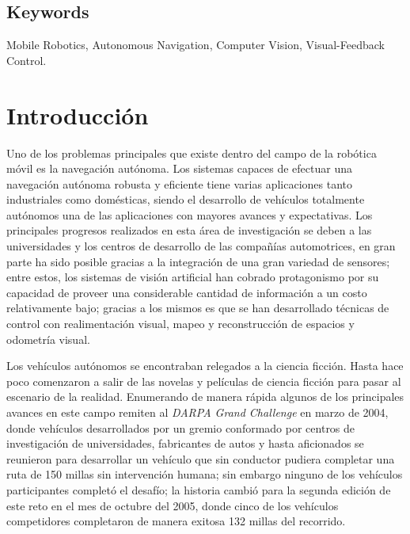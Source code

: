 \documentclass[12pt, letterpaper, oneside]{book}
\begin{document}
	\section*{Keywords}
	\label{sec:kw}
	Mobile Robotics, Autonomous Navigation, Computer Vision, Visual-Feedback Control.
	\renewcommand{\listfigurename}{Lista de Figuras}
	\renewcommand{\listtablename}{Lista de Tablas}
	\renewcommand{\contentsname}{Índice General}
	\renewcommand*{\lstlistlistingname}{Lista de Códigos}
	\tableofcontents
	\cleardoublepage
	\listoffigures
	\cleardoublepage
	\listoftables
	\cleardoublepage
	\lstlistoflistings
	\chapter*{Introducción}
	\label{cap:intro}
	Uno de los problemas principales que existe dentro del campo de la robótica móvil es la navegación autónoma. Los sistemas capaces de efectuar una navegación autónoma robusta y eficiente tiene varias aplicaciones tanto industriales como domésticas, siendo el desarrollo de vehículos totalmente autónomos una de las aplicaciones con mayores avances y expectativas. Los principales progresos realizados en esta área de investigación se deben a las universidades y los centros de desarrollo de las compañías automotrices, en gran parte ha sido posible gracias a la integración de una gran variedad de sensores; entre estos, los sistemas de visión artificial han cobrado protagonismo por su capacidad de proveer una considerable cantidad de información a un costo relativamente bajo; gracias a los mismos es que se han desarrollado técnicas de control con realimentación visual, mapeo y reconstrucción de espacios y odometría visual.
	\par Los vehículos autónomos se encontraban relegados a la ciencia ficción. Hasta hace poco comenzaron a salir de las novelas y películas de ciencia ficción para pasar al escenario de la realidad. Enumerando de manera rápida algunos de los principales avances en este campo remiten al {\it DARPA Grand Challenge} en marzo de 2004, donde vehículos desarrollados por un gremio conformado por centros de investigación de universidades, fabricantes de autos y hasta aficionados se reunieron para desarrollar un vehículo que sin conductor pudiera completar una ruta de 150 millas sin intervención humana; sin embargo ninguno de los vehículos participantes completó el desafío; la historia cambió para la segunda edición de este reto en el mes de octubre del 2005, donde cinco de los vehículos competidores completaron de manera exitosa 132 millas del recorrido.
\end{document}
